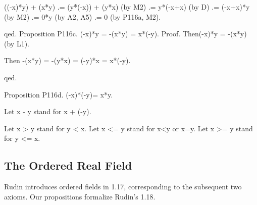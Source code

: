 \documentclass{article}
\newenvironment{forthel}{\begin{leftbar}}{\end{leftbar}}
\begin{document}
\begin{forthel}
((-x)*y) + (x*y) .= (y*(-x)) + (y*x) (by M2)
.= y*(-x+x) (by D) 
.= (-x+x)*y (by M2)
.= 0*y (by A2, A5)
.= 0 (by P116a, M2).

qed. 
Proposition P116c.
(-x)*y = -(x*y) = x*(-y).
Proof.
Then(-x)*y = -(x*y) (by L1).

Then -(x*y) = -(y*x) = (-y)*x = x*(-y).

qed. 

Proposition P116d.
(-x)*(-y)= x*y.


Let x - y stand for x + (-y).


Let x > y stand for y < x.
Let x <= y stand for x<y or x=y.
Let x >= y stand for y <= x.



\end{forthel}

\subsection{The Ordered Real Field}
Rudin introduces ordered fields in 1.17, corresponding to the subsequent two axioms. Our propositions formalize Rudin's 1.18.
\end{document}
